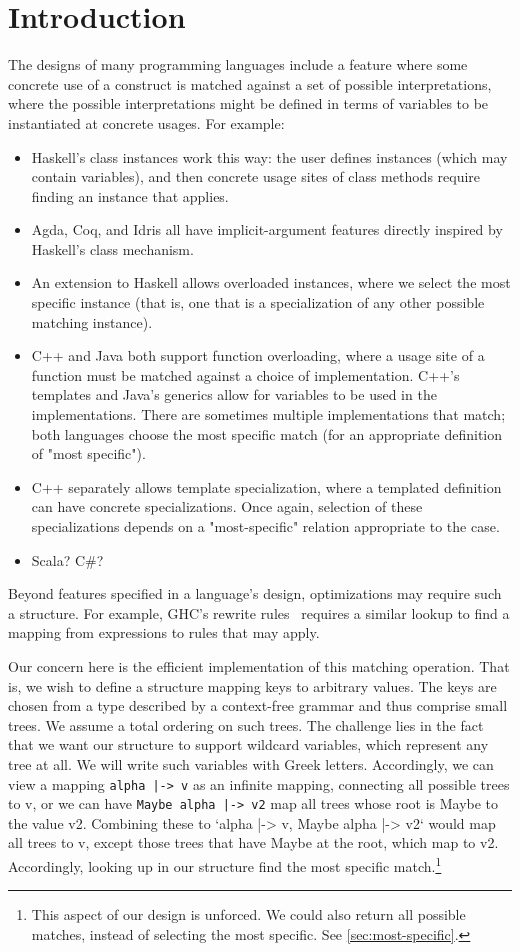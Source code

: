 \documentclass[format=sigplan]{acmart}
\theoremstyle{theorem}
\theoremstyle{definition}
\theoremstyle{remark}
\begin{document}
\section{Introduction} \label{sec:intro}

The designs of many programming languages include a feature where some concrete use of a construct is matched against a set of possible interpretations, where the possible interpretations might be defined in terms of variables to be instantiated at concrete usages. For example:
\begin{itemize}
\item Haskell's class instances work this way: the user defines instances (which may contain variables), and then concrete usage sites of class methods require finding an instance that applies.
\item Agda, Coq, and Idris all have implicit-argument features directly inspired by Haskell's class mechanism.
\item An extension to Haskell allows overloaded instances, where we select the most specific instance (that is, one that is a specialization of any other possible matching instance).
\item C++ and Java both support function overloading, where a usage site of a function must be matched against a choice of implementation. C++'s templates and Java's generics allow for variables to be used in the implementations. There are sometimes multiple implementations that match; both languages choose the most specific match (for an appropriate definition of "most specific").
\item C++ separately allows template specialization, where a templated definition can have concrete specializations. Once again, selection of these specializations depends on a "most-specific" relation appropriate to the case.
\item Scala? C\#?
\end{itemize}
Beyond features specified in a language's design, optimizations may require such a structure. For example, GHC's rewrite rules~\cite{rewrite-rules} requires a similar lookup to find a mapping from expressions to rules that may apply.

Our concern here is the efficient implementation of this matching
operation. That is, we wish to define a structure mapping keys to
arbitrary values. The keys are chosen from a type described by a
context-free grammar and thus comprise small trees. We assume a total
ordering on such trees. The challenge lies in the fact that we want
our structure to support wildcard variables, which represent any tree
at all. We will write such variables with Greek letters. Accordingly,
we can view a mapping \lstinline{alpha |-> v} as an infinite mapping, connecting
all possible trees to v, or we can have \lstinline{Maybe alpha |-> v2} map all
trees whose root is Maybe to the value v2. Combining these to `alpha
|-> v, Maybe alpha |-> v2` would map all trees to v, except those
trees that have Maybe at the root, which map to v2. Accordingly,
looking up in our structure find the most specific
match.\footnote{This aspect of our design is unforced. We could also
return all possible matches, instead of selecting the most
specific. See \cref{sec:most-specific}.}
\end{document}
